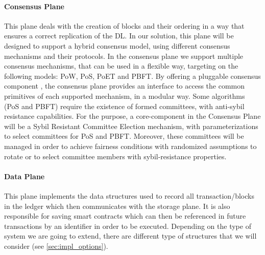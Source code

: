 \paragraph{Consensus Plane}

This plane deals with the creation of blocks and their ordering in a way that ensures a correct replication of the \gls{DL}. In our solution, this plane will be designed to support a hybrid consensus model, using different consensus mechanisms and their protocols. In the consensus plane we support multiple consensus mechanisms, that can be used in a flexible way, targeting on the following models: \gls{PoW}, \gls{PoS}, \gls{PoET} and \gls{PBFT}. By offering a pluggable consensus component \cite{dynamic_reconfiguration_consensus_IoT, research_self_adaptive_consensus}, the consensus plane provides an interface to access the common primitives of each supported mechanism, in a modular way. Some algorithms (\gls{PoS} and \gls{PBFT}) require the existence of formed committees, with anti-sybil resistance capabilities. For the purpose, a core-component in the Consensus Plane will be a Sybil Resistant Committee Election mechanism, with parameterizations to select committees for \gls{PoS} and \gls{PBFT}. Moreover, these committees will be managed in order to achieve fairness conditions with randomized assumptions to rotate or to select committee members with sybil-resistance properties.

\paragraph{Data Plane}
This plane implements the data structures used to record all transaction/blocks in the ledger which then communicates with the storage plane. It is also responsible for saving smart contracts which can then be referenced in future transactions by an identifier in order to be executed. Depending on the type of system we are going to extend, there are different type of structures that we will consider (see \ref{sec:impl_options}).

